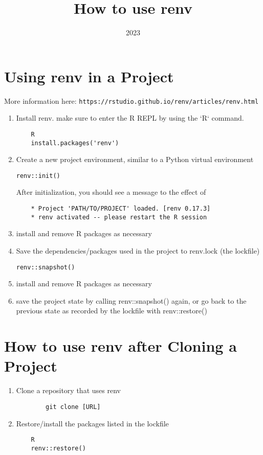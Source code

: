 \documentclass{article}
\title{How to use renv}
\date{2023}
\begin{document}
  
\maketitle
  
\tableofcontents

\section{Using renv in a Project}
More information here: \verb|https://rstudio.github.io/renv/articles/renv.html|

\begin{enumerate}
    \item Install renv. make sure to enter the R REPL by using the `R` command.
    \begin{verbatim}
    R
    install.packages('renv')
    \end{verbatim}
    \item Create a new project environment, similar to a Python virtual environment
    \begin{verbatim}renv::init()\end{verbatim}
	
	After initialization, you should see a message to the effect of
	\begin{verbatim}
	* Project 'PATH/TO/PROJECT' loaded. [renv 0.17.3]
	* renv activated -- please restart the R session
    \end{verbatim}
    \item install and remove R packages as necessary
    \item Save the dependencies/packages used in the project to renv.lock (the lockfile)
    \begin{verbatim}renv::snapshot()\end{verbatim}
    \item install and remove R packages as necessary
    \item save the project state by calling renv::snapshot() again, or go back to the previous state as recorded by the lockfile with renv::restore()
\end{enumerate}

\section{How to use renv after Cloning a Project}
\begin{enumerate}
    \item Clone a repository that uses renv
	\begin{verbatim}
	    git clone [URL]
    \end{verbatim}
    \item Restore/install the packages listed in the lockfile
	\begin{verbatim}
    R
    renv::restore()
	\end{verbatim}
\end{enumerate}
\end{document}
